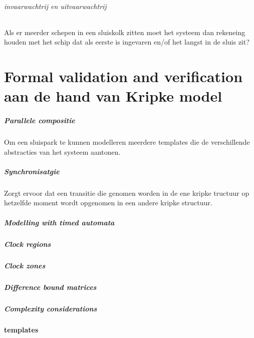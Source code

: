 {{{{{{{{{{{{{{\subparagraph{invaarwachtrij en uitvaarwachtrij}
Als er meerder schepen in een sluiskolk zitten moet het systeem dan rekeneing houden met het schip dat als eerste is ingevaren en/of het langst in de sluis zit?





\chapter{Formal validation and verification aan de hand van Kripke model}

\paragraph{Parallele compositie}
Om een sluispark te kunnen modelleren meerdere templates die de verschillende abstracties van het systeem aantonen.

\paragraph{Synchronisatgie}
Zorgt ervoor dat  een transitie die genomen worden in de ene kripke tructuur op hetzelfde moment wordt opgenomen in een andere kripke structuur.

\paragraph{Modelling with timed automata}
\paragraph{Clock regions}
\paragraph{Clock zones}
\paragraph{Difference bound matrices}
\paragraph{Complexity considerations}



\subsubsection{templates}

}}}}}}}}}}}}}}
